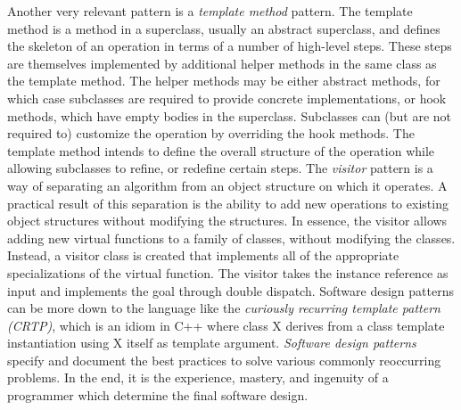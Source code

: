 \quad Another very relevant pattern is a \textit{template method} pattern. The template method is a method in a superclass, usually an abstract superclass, and defines the skeleton of an operation in terms of a number of high-level steps. These steps are themselves implemented by additional helper methods in the same class as the template method. The helper methods may be either abstract methods, for which case subclasses are required to provide concrete implementations, or hook methods, which have empty bodies in the superclass. Subclasses can (but are not required to) customize the operation by overriding the hook methods. The template method intends to define the overall structure of the operation while allowing subclasses to refine, or redefine certain steps.\newline\null
\quad The \textit{visitor} pattern is a way of separating an algorithm from an object structure on which it operates. A practical result of this separation is the ability to add new operations to existing object structures without modifying the structures. In essence, the visitor allows adding new virtual functions to a family of classes, without modifying the classes. Instead, a visitor class is created that implements all of the appropriate specializations of the virtual function. The visitor takes the instance reference as input and implements the goal through double dispatch.\newline\null
\quad Software design patterns can be more down to the language like the \textit{curiously recurring template pattern (CRTP)}, which is an idiom in C++ where class X derives from a class template instantiation using X itself as template argument.\newline\null
\quad \textit{Software design patterns} specify and document the best practices to solve various commonly reoccurring problems. In the end, it is the experience, mastery, and ingenuity of a programmer which determine the final software design.
